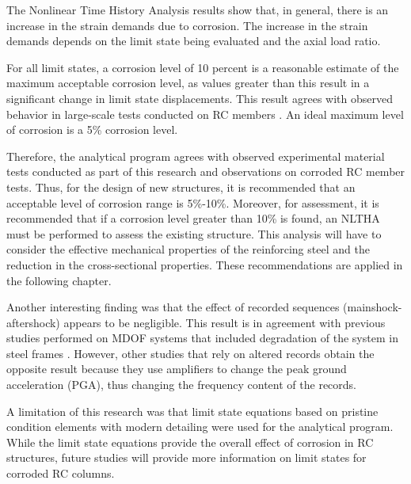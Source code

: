 The Nonlinear Time History Analysis results show that, in general, there is an increase in the strain demands due to corrosion. The increase in the strain demands depends on the limit state being evaluated and the axial load ratio. 

For all limit states, a corrosion level of 10 percent is a reasonable estimate of the maximum acceptable corrosion level, as values greater than this result in a significant change in limit state displacements. This result agrees with observed behavior in large-scale tests conducted on RC members \cite{Ma2012}\cite{Ma2018}. An ideal maximum level of corrosion is a 5\% corrosion level.

Therefore, the analytical program agrees with observed experimental material tests conducted as part of this research and observations on corroded RC member tests. Thus, for the design of new structures, it is recommended that an acceptable level of corrosion range is 5\%-10\%. Moreover, for assessment, it is recommended that if a corrosion level greater than 10\% is found, an NLTHA must be performed to assess the existing structure. This analysis will have to consider the effective mechanical properties of the reinforcing steel and the reduction in the cross-sectional properties. These recommendations are applied in the following chapter. 

Another interesting finding was that the effect of recorded sequences (mainshock-aftershock) appears to be negligible. This result is in agreement with previous studies performed on MDOF systems that included degradation of the system in steel frames \cite{Ruiz-Garcia2011}. However, other studies that rely on altered records obtain the opposite result because they use amplifiers to change the peak ground acceleration (PGA), thus changing the frequency content of the records.

A limitation of this research was that limit state equations based on pristine condition elements with modern detailing were used for the analytical program. While the limit state equations provide the overall effect of corrosion in RC structures, future studies will provide more information on limit states for corroded RC columns.